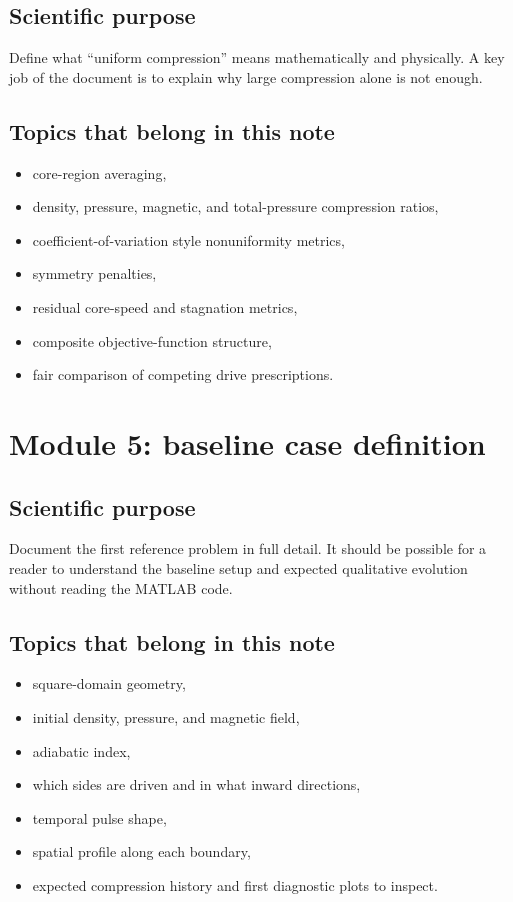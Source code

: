 \documentclass[11pt]{article}
\begin{document}
\subsection{Scientific purpose}
Define what ``uniform compression'' means mathematically and physically. A key job of the document is to explain why large compression alone is not enough.

\subsection{Topics that belong in this note}
\begin{itemize}[leftmargin=1.8em]
    \item core-region averaging,
    \item density, pressure, magnetic, and total-pressure compression ratios,
    \item coefficient-of-variation style nonuniformity metrics,
    \item symmetry penalties,
    \item residual core-speed and stagnation metrics,
    \item composite objective-function structure,
    \item fair comparison of competing drive prescriptions.
\end{itemize}

\section{Module 5: baseline case definition}
\subsection{Scientific purpose}
Document the first reference problem in full detail. It should be possible for a reader to understand the baseline setup and expected qualitative evolution without reading the MATLAB code.

\subsection{Topics that belong in this note}
\begin{itemize}[leftmargin=1.8em]
    \item square-domain geometry,
    \item initial density, pressure, and magnetic field,
    \item adiabatic index,
    \item which sides are driven and in what inward directions,
    \item temporal pulse shape,
    \item spatial profile along each boundary,
    \item expected compression history and first diagnostic plots to inspect.
\end{itemize}
\end{document}
